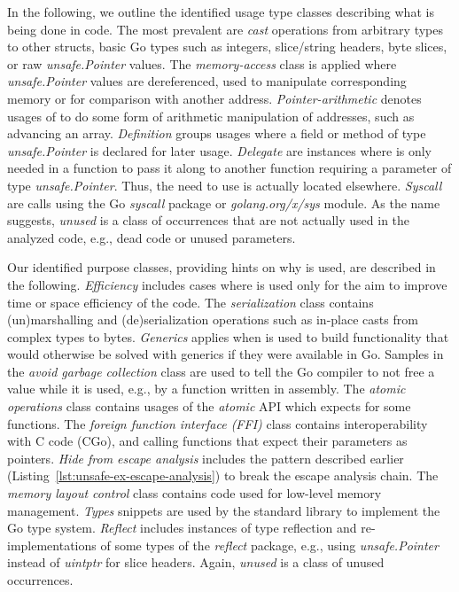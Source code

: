 In the following, we outline the identified usage type classes describing what is being done in code.
The most prevalent are \textit{cast} operations from arbitrary types to other structs, basic Go types such as integers, slice/string headers, byte slices, or raw \textit{unsafe.Pointer} values. 
The \textit{memory-access} class is applied where \textit{unsafe.Pointer} values are dereferenced, used to manipulate corresponding memory or for comparison with another address.
\textit{Pointer-arithmetic} denotes usages of \unsafe{} to do some form of arithmetic manipulation of addresses, such as advancing an array.
\textit{Definition} groups usages where a field or method of type \textit{unsafe.Pointer} is declared for later usage.
\textit{Delegate} are instances where \unsafe{} is only needed in a function to pass it along to another function requiring a parameter of type \textit{unsafe.Pointer}. 
Thus, the need to use \unsafe{} is actually located elsewhere.
\textit{Syscall} are calls using the Go \textit{syscall} package or \textit{golang.org/x/sys} module.
As the name suggests, \textit{unused} is a class of occurrences that are not actually used in the analyzed code, e.g., dead code or unused parameters.

Our identified purpose classes, providing hints on why \unsafe{} is used, are described in the following.
\textit{Efficiency} includes cases where \unsafe{} is used only for the aim to improve time or space efficiency of the code.
The \textit{serialization} class contains (un)marshalling and (de)serialization operations such as in-place casts from complex types to bytes.
\textit{Generics} applies when \unsafe{} is used to build functionality that would otherwise be solved with generics if they were available in Go.
Samples in the \textit{avoid garbage collection} class are used to tell the Go compiler to not free a value while it is used, e.g., by a function written in assembly.
The \textit{atomic operations} class contains usages of the \textit{atomic} API which expects \unsafe{} for some functions.
The \textit{foreign function interface (FFI)} class contains interoperability with C code (CGo), and calling  functions that expect their parameters as \unsafe{} pointers.
\textit{Hide from escape analysis} includes the pattern described earlier (Listing~\ref{lst:unsafe-ex-escape-analysis}) to break the escape analysis chain.
The \textit{memory layout control} class contains code used for low-level memory management.
\textit{Types} snippets are used by the standard library to implement the Go type system.
\textit{Reflect} includes instances of type reflection and re-implementations of some types of the \textit{reflect} package, e.g., using \textit{unsafe.Pointer} instead of \textit{uintptr} for slice headers.
Again, \textit{unused} is a class of unused occurrences.


